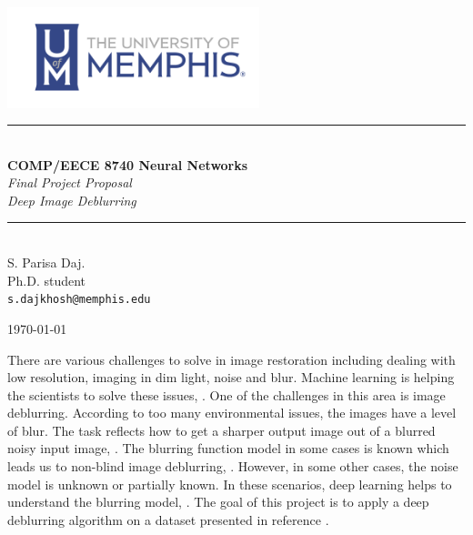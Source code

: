 \documentclass[12pt,a4paper]{article}
\newcommand{\HRule}{\rule{\linewidth}{0.5mm}}
\begin{document}
	
	\begin{titlepage}
		\begin{center}
			
			\includegraphics[width=0.55\textwidth]{figs/cslogo_horizontal.png}~\\[2cm]
			
			
			\HRule \\[0.4cm]
			{ \LARGE 
				\textbf{COMP/EECE 8740 Neural Networks}\\[0.4cm]
				\emph{Final Project Proposal}\\[0.4cm]
				\emph{Deep Image Deblurring}\\[0.4cm]
			}
			\HRule \\[1.5cm]
			
			
			
			{ \large
				S. Parisa Daj. \\[0.1cm]
				Ph.D. student\\[0.1cm]
				\texttt{s.dajkhosh@memphis.edu}
			}
			
			\vfill
			
			
			{\large \today}
			
		\end{center}
	\end{titlepage}

There are various challenges to solve in image restoration including dealing with low resolution, imaging in dim light, noise and blur. Machine learning is helping the scientists to solve these issues, \cite{Ozcan2019}. One of the challenges in this area is image deblurring.  According to too many environmental issues, the images have a level of blur. The task reflects how to get a sharper output image out of a blurred noisy input image, \cite{Li2020}. The blurring function model in some cases is known which leads us to non-blind image deblurring, \cite{Nan2020}. However, in some other cases, the noise model is unknown or partially known. In these scenarios, deep learning helps to understand the blurring model, \cite{Li2020}. The goal of this project is to apply a deep deblurring algorithm on a dataset presented in reference \cite{vem}.

\nocite{*}


\end{document}
